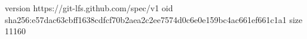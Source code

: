 version https://git-lfs.github.com/spec/v1
oid sha256:e57dac63cbff1638cdfcf70b2aea2c2ee7574d0c6e0e159bc4ac661ef661c1a1
size 11160

